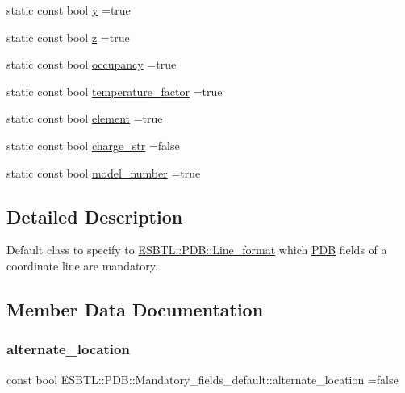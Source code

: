 \begin{DoxyCompactItemize}
static const bool \hyperlink{structESBTL_1_1PDB_1_1Mandatory__fields__default_af02901a3a743322dd9803e2779ff726b}{y} =true
\item 
static const bool \hyperlink{structESBTL_1_1PDB_1_1Mandatory__fields__default_a9a2d2106ac7097788d129e1063afb9ee}{z} =true
\item 
static const bool \hyperlink{structESBTL_1_1PDB_1_1Mandatory__fields__default_a38a86563f0c33163200018472e26df7e}{occupancy} =true
\item 
static const bool \hyperlink{structESBTL_1_1PDB_1_1Mandatory__fields__default_a82463343012e73fc61f089f73ab86a12}{temperature\+\_\+factor} =true
\item 
static const bool \hyperlink{structESBTL_1_1PDB_1_1Mandatory__fields__default_a2445724aba93a0a66614e92d055855bb}{element} =true
\item 
static const bool \hyperlink{structESBTL_1_1PDB_1_1Mandatory__fields__default_adc09459ca750b160b1dd909f27911e11}{charge\+\_\+str} =false
\item 
static const bool \hyperlink{structESBTL_1_1PDB_1_1Mandatory__fields__default_a4e8bf6e67a66c3331f753bcec340645d}{model\+\_\+number} =true
\end{DoxyCompactItemize}


\subsection{Detailed Description}
Default class to specify to \hyperlink{classESBTL_1_1PDB_1_1Line__format}{E\+S\+B\+T\+L\+::\+P\+D\+B\+::\+Line\+\_\+format} which \hyperlink{namespaceESBTL_1_1PDB}{P\+DB} fields of a coordinate line are mandatory. 

\subsection{Member Data Documentation}
\mbox{\label{structESBTL_1_1PDB_1_1Mandatory__fields__default_a2d59e42b7d45c283aae04065ab64ec83}} 
\subsubsection{\texorpdfstring{alternate\+\_\+location}{alternate\_location}}
{\footnotesize\ttfamily const bool E\+S\+B\+T\+L\+::\+P\+D\+B\+::\+Mandatory\+\_\+fields\+\_\+default\+::alternate\+\_\+location =false\hspace{0.3cm}{\ttfamily [static]}}

